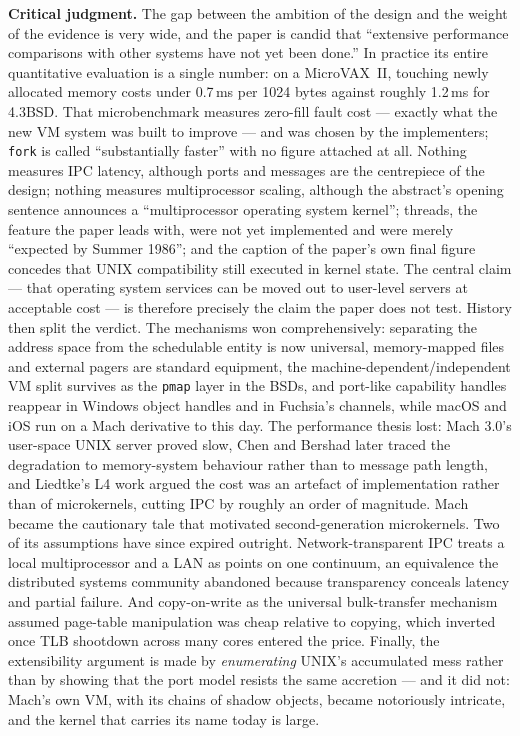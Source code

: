\textbf{Critical judgment.} The gap between the ambition of the design and the weight of the
evidence is very wide, and the paper is candid that ``extensive performance comparisons with
other systems have not yet been done.'' In practice its entire quantitative evaluation is a
single number: on a MicroVAX~II, touching newly allocated memory costs under 0.7\,ms per
1024 bytes against roughly 1.2\,ms for 4.3BSD. That microbenchmark measures zero-fill fault
cost --- exactly what the new VM system was built to improve --- and was chosen by the
implementers; \texttt{fork} is called ``substantially faster'' with no figure attached at all.
Nothing measures IPC latency, although ports and messages are the centrepiece of the design;
nothing measures multiprocessor scaling, although the abstract's opening sentence announces a
``multiprocessor operating system kernel''; threads, the feature the paper leads with, were not yet implemented and were merely
``expected by Summer 1986''; and the caption of the paper's own final figure concedes that
UNIX compatibility still executed in kernel state. The central claim --- that operating
system services can be moved out to user-level servers at acceptable cost --- is therefore
precisely the claim the paper does not test. History then split the verdict. The mechanisms
won comprehensively: separating the address space from the schedulable entity is now
universal, memory-mapped files and external pagers are standard equipment, the
machine-dependent/independent VM split survives as the \texttt{pmap} layer in the BSDs, and
port-like capability handles reappear in Windows object handles and in Fuchsia's channels,
while macOS and iOS run on a Mach derivative to this day. The performance thesis lost: Mach
3.0's user-space UNIX server proved slow, Chen and Bershad later traced the degradation to
memory-system behaviour rather than to message path length, and Liedtke's L4 work argued the
cost was an artefact of implementation rather than of microkernels, cutting IPC by roughly an
order of magnitude. Mach became the cautionary tale that motivated second-generation
microkernels. Two of its assumptions have since expired outright. Network-transparent IPC
treats a local multiprocessor and a LAN as points on one continuum, an equivalence the
distributed systems community abandoned because transparency conceals latency and partial
failure. And copy-on-write as the universal bulk-transfer mechanism assumed page-table
manipulation was cheap relative to copying, which inverted once TLB shootdown across many
cores entered the price. Finally, the extensibility argument is made by \emph{enumerating}
UNIX's accumulated mess rather than by showing that the port model resists the same
accretion --- and it did not: Mach's own VM, with its chains of shadow objects, became
notoriously intricate, and the kernel that carries its name today is large.

